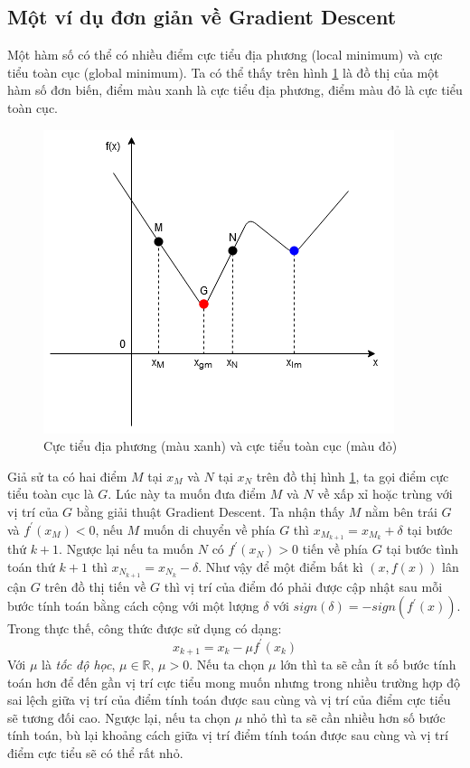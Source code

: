 \subsection{Một ví dụ đơn giản về Gradient Descent}
Một hàm số có thể có nhiều điểm cực tiểu địa phương (local minimum) và cực tiểu toàn cục (global minimum). Ta có thể thấy trên hình \ref{fig:minimums} là đồ thị của một hàm số đơn biến, điểm màu xanh là cực tiểu địa phương, điểm màu đỏ là cực tiểu toàn cục.
\begin{figure}[ht!]
	\centerline{\includegraphics[scale=0.8]{images/minimums.png}}
  	\caption{Cực tiểu địa phương (màu xanh) và cực tiểu toàn cục (màu đỏ)}
  	\label{fig:minimums}
\end{figure}
Giả sử ta có hai điểm $M$ tại $x_M$ và $N$ tại $x_N$ trên đồ thị hình \ref{fig:minimums}, ta gọi điểm cực tiểu toàn cục là $G$. Lúc này ta muốn đưa điểm $M$ và $N$ về xấp xỉ hoặc trùng với vị trí của $G$ bằng giải thuật Gradient Descent. Ta nhận thấy $M$ nằm bên trái $G$ và $f^{'}(x_{M})<0$, nếu $M$ muốn di chuyển về phía $G$ thì $x_{M_{k+1}}=x_{M_{k}}+\delta$ tại bước thứ $k+1$. Ngược lại nếu ta muốn $N$ có $f^{'}(x_{N})>0$ tiến về phía $G$ tại bước tình toán thứ $k+1$ thì $x_{N_{k+1}}=x_{N_{k}}-\delta$. Như vậy để một điểm bất kì $(x,f(x))$ lân cận $G$ trên đồ thị tiến về $G$ thì vị trí của điểm đó phải được cập nhật sau mỗi bước tính toán bằng cách cộng với một lượng $\delta$ với $sign(\delta)=-sign(f^{'}(x))$. Trong thực thế, công thức được sử dụng có dạng:
\begin{equation}
	x_{k+1}=x_{k}-{\mu}f^{'}(x_{k})
\end{equation}
Với $\mu$ là \emph{tốc độ học}, ${\mu}{\in}{\mathbb{R}}$, ${\mu}>0$. Nếu ta chọn $\mu$ lớn thì ta sẽ cần ít số bước tính toán hơn để đến gần vị trí cực tiểu mong muốn nhưng trong nhiều trường hợp độ sai lệch giữa vị trí của điểm tính toán được sau cùng và vị trí của điểm cực tiểu sẽ tương đối cao. Ngược lại, nếu ta chọn $\mu$ nhỏ thì ta sẽ cần nhiều hơn số bước tính toán, bù lại khoảng cách giữa vị trí điểm tính toán được sau cùng và vị trí điểm cực tiểu sẽ có thể rất nhỏ.

